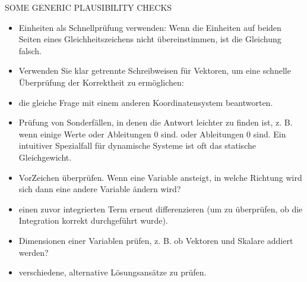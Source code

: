 SOME GENERIC PLAUSIBILITY CHECKS
\begin{itemize}
\item Einheiten als Schnellprüfung verwenden: Wenn die Einheiten auf beiden Seiten eines Gleichheitszeichens nicht übereinstimmen, ist die Gleichung 
falsch.
\item Verwenden Sie klar getrennte Schreibweisen für Vektoren, um eine schnelle Überprüfung der Korrektheit zu ermöglichen: 
    \item die gleiche Frage mit einem anderen Koordinatensystem beantworten.
    \item  Prüfung von Sonderfällen, in denen die Antwort leichter zu finden ist, z. B. wenn einige Werte oder Ableitungen 0 sind. 
oder Ableitungen 0 sind. Ein intuitiver Spezialfall für dynamische Systeme ist oft das statische Gleichgewicht. 
    \item VorZeichen überprüfen. Wenn eine Variable ansteigt, in welche Richtung wird sich dann eine andere Variable ändern wird?
    \item  einen zuvor integrierten Term erneut differenzieren (um zu überprüfen, ob die Integration korrekt durchgeführt wurde). 
        \item Dimensionen einer Variablen prüfen, z. B. ob Vektoren und Skalare addiert werden?
    \item  verschiedene, alternative Lösungsansätze zu prüfen.
\end{itemize}

